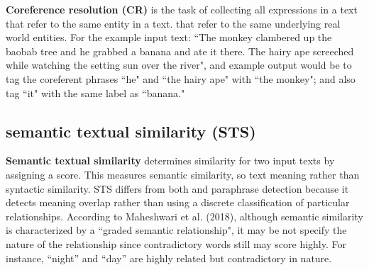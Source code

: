 \textbf{Coreference resolution (CR)} is the task of collecting all expressions in a text that refer to the same entity in a text.  that refer to the same underlying real world entities. For the example input text: ``The monkey clambered up the baobab tree and he grabbed a banana and ate it there. The hairy ape screeched while watching the setting sun over the river", and example output would be to tag the coreferent phrases ``he" and ``the hairy ape" with  ``the monkey"; and also tag ``it" with the same label as ``banana." 







\subsection{semantic textual similarity (STS)} \label{nlptask:semantictextualsimilaritySTS}

\textbf{Semantic textual similarity} determines similarity for two input texts by assigning a score. This measures semantic similarity, so text meaning rather than syntactic similarity. STS differs from both  and paraphrase detection because it detects meaning overlap rather than using a discrete classification of particular relationships. According to Maheshwari et al. (2018), although semantic similarity is characterized by a ``graded semantic relationship", it may be not specify the nature of the relationship since contradictory words still may score highly. For instance, ``night” and ``day” are highly related but contradictory in nature. 



